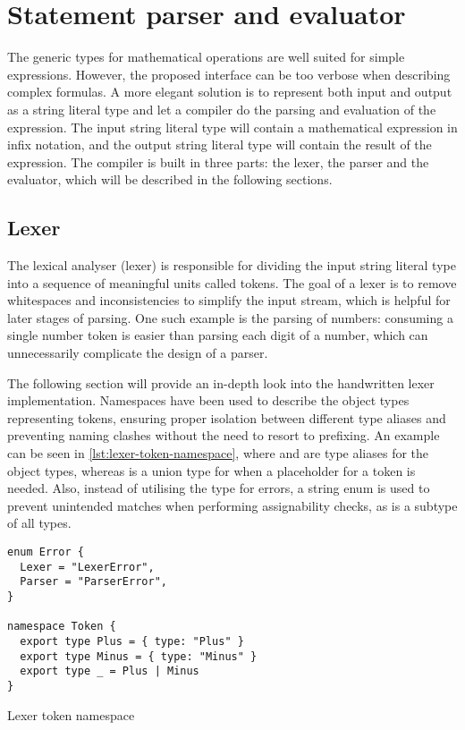 

\section{Statement parser and evaluator}

The generic types for mathematical operations are well suited for simple expressions. However, the proposed interface can be too verbose when describing complex formulas. A more elegant solution is to represent both input and output as a string literal type and let a compiler do the parsing and evaluation of the expression. The input string literal type will contain a mathematical expression in infix notation, and the output string literal type will contain the result of the expression. The compiler is built in three parts: the lexer, the parser and the evaluator, which will be described in the following sections.

\subsection{Lexer}

The lexical analyser (lexer) is responsible for dividing the input string literal type into a sequence of meaningful units called tokens. The goal of a lexer is to remove whitespaces and inconsistencies to simplify the input stream, which is helpful for later stages of parsing. One such example is the parsing of numbers: consuming a single number token is easier than parsing each digit of a number, which can unnecessarily complicate the design of a parser.

The following section will provide an in-depth look into the handwritten lexer implementation. Namespaces have been used to describe the object types representing tokens, ensuring proper isolation between different type aliases and preventing naming clashes without the need to resort to prefixing. An example can be seen in \ref{lst:lexer-token-namespace}, where  and  are type aliases for the object types, whereas \vcode{_} is a union type for when a placeholder for a token is needed. Also, instead of utilising the  type for errors, a string enum is used to prevent unintended matches when performing assignability checks, as  is a subtype of all types.

\begin{listing}[ht]
  \begin{verbatim}
enum Error {
  Lexer = "LexerError",
  Parser = "ParserError",
}

namespace Token {
  export type Plus = { type: "Plus" } 
  export type Minus = { type: "Minus" } 
  export type _ = Plus | Minus
} 
\end{verbatim}
  \caption{Lexer token namespace}\label{lst:lexer-token-namespace}
\end{listing}


